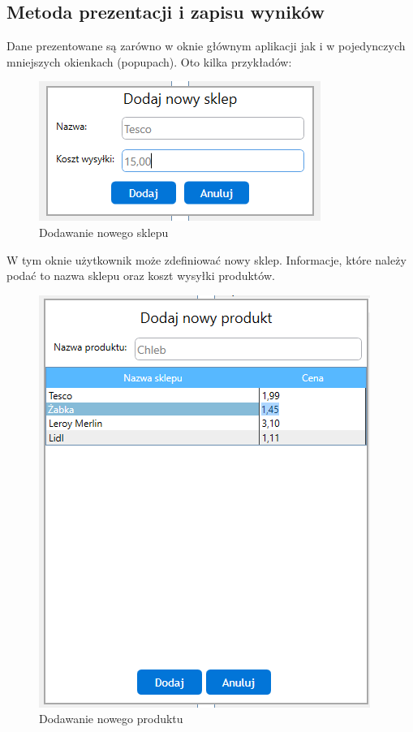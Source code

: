 \documentclass[a4paper]{article}
\begin{document}
\subsection{Metoda prezentacji i zapisu wyników}
Dane prezentowane są zarówno w oknie głównym aplikacji jak i w pojedynczych mniejszych okienkach (popupach). Oto kilka przykładów:
\newline
\begin{figure}[H]
\centering
\includegraphics[width=\textwidth,keepaspectratio]{img/modal-nowy-sklep.png}
\caption{Dodawanie nowego sklepu}
\end{figure}
\begin{flushleft}
W tym oknie użytkownik może zdefiniować nowy sklep. Informacje, które należy podać to nazwa sklepu oraz koszt wysyłki produktów.
\end{flushleft}
\begin{figure}[H]
\centering
\includegraphics[width=\textwidth,keepaspectratio]{img/modal-nowy-produkt.png}
\caption{Dodawanie nowego produktu}
\end{figure}
\end{document}
